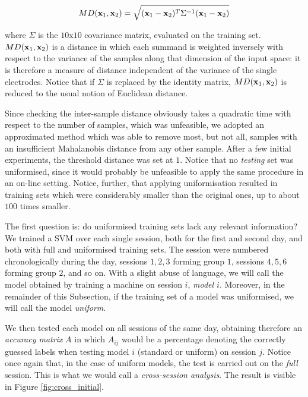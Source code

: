 $$ MD(\mathbf{x}_1,\mathbf{x}_2) = \sqrt{(\mathbf{x}_1-\mathbf{x}_2)^T \Sigma^{-1} (\mathbf{x}_1-\mathbf{x}_2)} $$

\noindent where $\Sigma$ is the $10$x$10$ covariance matrix, evaluated
on the training set. $MD(\mathbf{x}_1,\mathbf{x}_2)$ is a distance in which each
summand is weighted inversely with respect to the variance of the
samples along that dimension of the input space: it is therefore a
measure of distance independent of the variance of the single
electrodes. Notice that if $\Sigma$ is replaced by the identity
matrix, $MD(\mathbf{x}_1,\mathbf{x}_2)$ is reduced to the usual notion of Euclidean
distance.

Since checking the inter-sample distance obviously takes a quadratic
time with respect to the number of samples, which was unfeasible, we
adopted an approximated method which was able to remove most, but not
all, samples with an insufficient Mahalanobis distance from any other
sample. After a few initial experiments, the threshold distance was
set at $1$. Notice that no \emph{testing} set was uniformised, since
it would probably be unfeasible to apply the same procedure in an
on-line setting. Notice, further, that applying uniformisation
resulted in training sets which were considerably smaller than the
original ones, up to about $100$ times smaller.

The first question is: do uniformised training sets lack any relevant
information? We trained a SVM over each single session, both for the
first and second day, and both with full and uniformised training
sets. The session were numbered chronologically during the day,
sessions $1,2,3$ forming group $1$, sessions $4,5,6$ forming group
$2$, and so on. With a slight abuse of language, we will call the
model obtained by training a machine on session $i$, \emph{model
$i$}. Moreover, in the remainder of this Subsection, if the training
set of a model was uniformised, we will call the model \emph{uniform}.

We then tested each model on all sessions of the same day, obtaining
therefore an \emph{accuracy matrix} $A$ in which $A_{ij}$ would be a
percentage denoting the correctly guessed labels when testing model
$i$ (standard or uniform) on session $j$. Notice once again that, in
the case of uniform models, the test is carried out on the \emph{full}
session. This is what we would call a \emph{cross-session analysis}.
The result is visible in Figure \ref{fig:cross_initial}.

